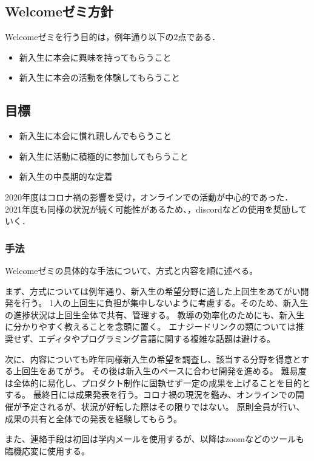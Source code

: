 \subsection*{Welcomeゼミ方針}


Welcomeゼミを行う目的は，例年通り以下の2点である．

\begin{itemize}
    \item 新入生に本会に興味を持ってもらうこと
    \item 新入生に本会の活動を体験してもらうこと
\end{itemize}

\subsection*{目標}
\begin{itemize}
    \item 新入生に本会に慣れ親しんでもらうこと
    \item 新入生に活動に積極的に参加してもらうこと
    \item 新入生の中長期的な定着
\end{itemize}

2020年度はコロナ禍の影響を受け，オンラインでの活動が中心的であった．
2021年度も同様の状況が続く可能性があるため、，discordなどの使用を奨励していく．

\subsubsection*{手法}
Welcomeゼミの具体的な手法について、方式と内容を順に述べる。

まず、方式については例年通り、新入生の希望分野に適した上回生をあてがい開発を行う。
1人の上回生に負担が集中しないように考慮する。そのため、新入生の進捗状況は上回生全体で共有、管理する。
教導の効率化のためにも、新入生に分かりやすく教えることを念頭に置く。
エナジードリンクの類については推奨せず、エディタやプログラミング言語に関する複雑な話題は避ける。

次に、内容についても昨年同様新入生の希望を調査し、該当する分野を得意とする上回生をあてがう。
その後は新入生のペースに合わせ開発を進める。
難易度は全体的に易化し、プロダクト制作に固執せず一定の成果を上げることを目的とする。
最終日には成果発表を行う。コロナ禍の現況を鑑み、オンラインでの開催が予定されるが、状況が好転した際はその限りではない。
原則全員が行い、成果の共有と全体での発表を経験してもらう。

また、連絡手段は初回は学内メールを使用するが、以降はzoomなどのツールも臨機応変に使用する。
